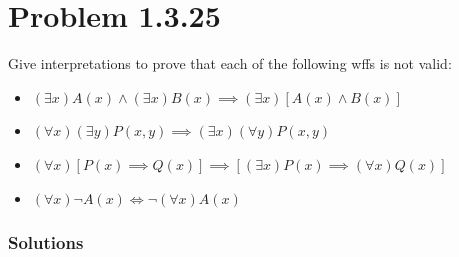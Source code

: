 \documentclass[12pt]{article}
\begin{document}
\section*{Problem 1.3.25}
Give interpretations to prove that each of the following wffs is not valid:
\begin{itemize}
    \item[a.] \((\exists x)A(x) \land (\exists x)B(x) \implies (\exists x)[A(x) \land B(x)]\)
    \item[b.] \((\forall x)(\exists y)P(x, y) \implies (\exists x)(\forall y)P(x, y)\)
    \item[c.] \((\forall x)[P(x) \implies Q(x)] \implies [(\exists x)P(x) \implies (\forall x)Q(x)]\)
    \item[d.] \((\forall x)\lnot A(x) \iff \lnot (\forall x)A(x)\)
\end{itemize}

\subsubsection*{Solutions}
\end{document}
